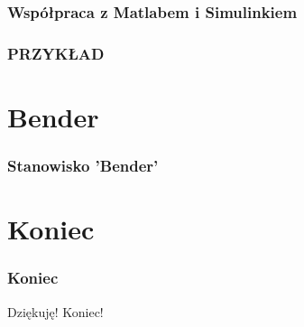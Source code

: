 \documentclass[12pt,a4paper,portrait]{beamer}
\begin{document}
\begin{frame}
\frametitle{Współpraca z Matlabem i Simulinkiem}
\end{frame}

\begin{frame}
\frametitle{PRZYKŁAD}
\end{frame}





\section{Bender}
\begin{frame}
\frametitle{Stanowisko 'Bender'}
\end{frame}



\section{Koniec}
\begin{frame}
\frametitle{Koniec}
Dziękuję! Koniec!
\end{frame}
\end{document}
